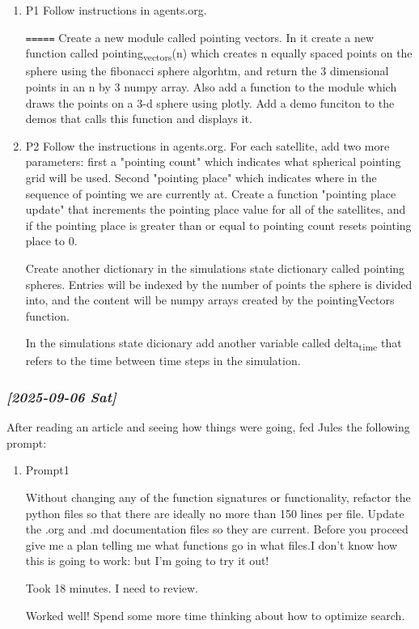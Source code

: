 \documentclass[11pt]{article}
\begin{document}
\begin{enumerate}
\item P1
\label{sec:org0bc53ca}
Follow instructions in agents.org.

\texttt{=====}
Create a new module called pointing vectors. In it
create a new function called pointing\textsubscript{vectors}(n) which 
creates n equally spaced
points on the sphere using the fibonacci sphere algorhtm, and return the
3 dimensional points in an n by 3 numpy array.
Also add a function to the module which draws the points 
on a 3-d sphere using
plotly.
Add a demo funciton to the demos that calls this function and 
displays it.

\item P2
\label{sec:org36e90a3}
Follow  the instructions in agents.org.
For each satellite, add two more parameters:  first a "pointing count" which
indicates what spherical pointing grid will be used.  Second "pointing place"
which indicates where in the sequence of pointing we are currently at.
Create a function "pointing place update" that increments the pointing place
value for all of the satellites, and if the pointing place is greater than or
equal to pointing count resets pointing place to 0.

Create another dictionary in the simulations state dictionary called
pointing spheres.  Entries will be indexed by the number of points the
sphere is divided into, and the content will be numpy arrays created by
the pointingVectors function.

In the simulations state dicionary add another variable called delta\textsubscript{time} that
refers to the time between time steps in the simulation.
\end{enumerate}




\subsubsection{\textit{[2025-09-06 Sat]}}
\label{sec:org7849ad5}
After reading an article and seeing how things were going, fed Jules the following prompt:


\begin{enumerate}
\item Prompt1
\label{sec:org0909ae8}

Without changing any of the function signatures or functionality,
refactor the python files so that there are ideally no more than 150 lines per file.
Update the .org and .md documentation files so they are current. Before you
proceed give me a plan telling me what functions go in what files.I don't know
how this is going to work: but I'm going to try it out!

Took 18 minutes.  I need to review.

Worked well!  Spend some more time thinking about how to optimize search.
\end{enumerate}
\end{document}
